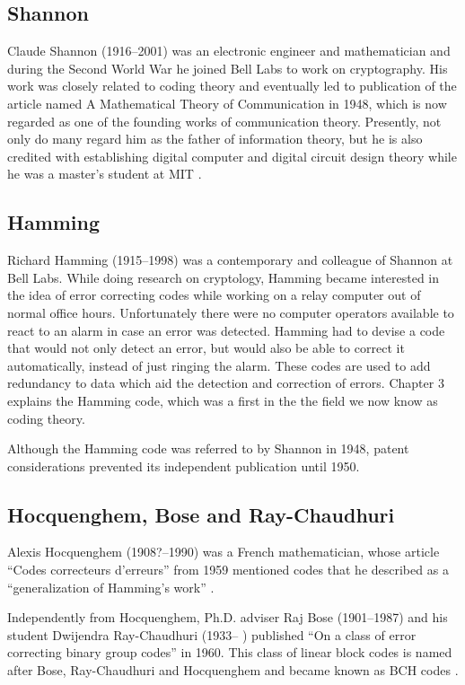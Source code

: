 \documentclass[../main.tex]{subfiles}
\begin{document}
    \subsection{Shannon}
    Claude Shannon (1916–2001) was an electronic engineer and mathematician and during the Second World War he joined Bell Labs to work on cryptography. His work was closely related to coding theory and eventually led to publication of the article named A Mathematical Theory of Communication in 1948, which is now regarded as one of the founding works of communication theory. Presently, not only do many regard him as the father of information theory, but he is also credited with establishing digital computer and digital circuit design theory while he was a master's student at MIT \autocite{bose2008information}.


    \subsection{Hamming}
    Richard Hamming (1915–1998) was a contemporary and colleague of Shannon at Bell Labs. While doing research on cryptology, Hamming became interested in the idea of error correcting codes while working on a relay computer out of normal office hours. Unfortunately there were no computer operators available to react to an alarm in case an error was detected. Hamming had to devise a code that would not only detect an error, but would also be able to correct it automatically, instead of just ringing the alarm. These codes are used to add redundancy to data which aid the detection and correction of errors. Chapter 3 explains the Hamming code, which was a first in the the field we now know as coding theory.

    Although the Hamming code was referred to by Shannon in 1948, patent considerations prevented its independent publication until 1950.


    \subsection{Hocquenghem, Bose and Ray-Chaudhuri}
    Alexis Hocquenghem (1908?–1990) was a French mathematician, whose article “Codes correcteurs d'erreurs” from 1959 mentioned codes that he described as a “generalization of Hamming's work” \autocite{hocquenghem1999codes}.

    Independently from Hocquenghem, Ph.D. adviser Raj Bose (1901–1987) and his student Dwijendra Ray-Chaudhuri (1933– ) published “On a class of error correcting binary group codes” in 1960. This class of linear block codes is named after Bose, Ray-Chaudhuri and Hocquenghem and became known as BCH codes \autocite{wicker1999reed}.
\end{document}
